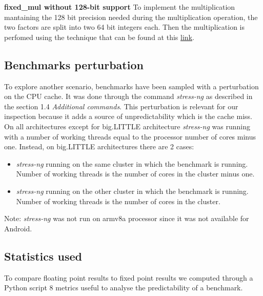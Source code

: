\textbf{fixed\_mul without 128-bit support}\newline
To implement the multiplication mantaining the 128 bit precision needed during the multiplication operation,  the two factors are split into two 64 bit integers each. Then the multiplication is perfomed using the technique that can be found at this \href{https://stackoverflow.com/questions/31652875/fastest-way-to-multiply-two-64-bit-ints-to-128-bit-then-to-64-bit}{link}.

\subsection{Benchmarks perturbation}
To explore another scenario, benchmarks have been sampled with a perturbation on the CPU cache. It was done through the command \textit{stress-ng} as described in the section 1.4 \textit{Additional commands}.
This perturbation is relevant for our inspection because it adds a source of unpredictability which is the cache miss.\newline
On all architectures except for big.LITTLE architecture \textit{stress-ng} was running with a number of working threads equal to the processor number of cores minus one. Instead, on big.LITTLE architectures there are 2 cases:
\begin{itemize}
	\item \textit{stress-ng} running on the same cluster in which the benchmark is running. Number of working threads is the number of cores in the cluster minus one.
	\item  \textit{stress-ng} running on the other cluster in which the benchmark is running. Number of working threads is the number of cores in the cluster.
\end{itemize}
Note: \textit{stress-ng} was not run on armv8a processor since it was not available for Android.
\subsection{Statistics used}
To compare floating point results to fixed point results we computed through a Python script 8 metrics useful to analyse the predictability of a benchmark.

